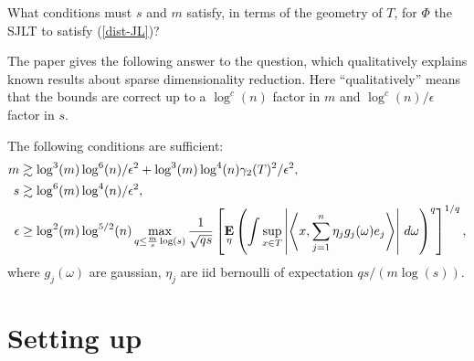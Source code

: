 \begin{question}
  What conditions must $s$ and $m$ satisfy, in terms of the geometry
  of $T$, for $\Phi$ the SJLT to satisfy (\ref{dist-JL})?
\end{question}

The paper gives the following answer to the question, which
qualitatively explains known results about sparse dimensionality
reduction. Here ``qualitatively'' means that the bounds are correct up
to a $\log^c(n)$ factor in $m$ and $\log^c(n)/\epsilon$ factor in $s$.

\begin{theorem}
  The following conditions are sufficient:
  \begin{align*}
    m &\gtrsim \log^3(m)\log^6(n)/\epsilon^2 +
    \log^3(m)\log^4(n)\gamma_2(T)^2/\epsilon^2, \\ s &\gtrsim
    \log^6(m)\log^4(n)/\epsilon^2, \\ \epsilon &\ge
    \log^2(m)\log^{5/2}(n) \max_{q \le \frac{m}{s} \log(s)}
    \frac{1}{\sqrt{qs}} \left[ \operatorname*{\mathbf{E}}_\eta \left( \int \sup_{x \in T}
      \left| \left\langle x, \sum_{j=1}^n \eta_j g_j(\omega) e_j
      \right\rangle \right| \,d\omega \right)^q \right]^{1/q},
  \end{align*}
  where $g_j(\omega)$ are gaussian, $\eta_j$ are iid bernoulli of
  expectation $qs/(m\log(s))$.
\end{theorem}


\section{Setting up}

\renewcommand{\A}{\mathcal{A}}
\renewcommand{\N}{\mathcal{N}}
\newcommand{\conv}{\operatorname{conv}}
\newcommand{\diam}{\operatorname{diam}}
\newcommand{\gmw}{\operatorname{gmw}}
\newcommand{\op}{\mathrm{op}}
\newcommand{\trip}{\interleave}

